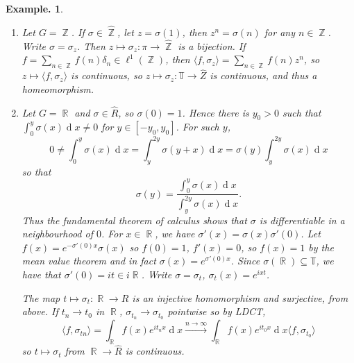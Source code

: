 \documentclass[11pt, a4paper]{memoir}
\DeclareMathOperator{\Z}{{\mathbb{Z}}}
\DeclareMathOperator{\R}{{\mathbb{R}}}
\newcommand{\fto}[1]{\ensuremath{\xrightarrow{\scriptstyle{#1}}}}
\theoremstyle{change}
\theoremstyle{plain}
\theoremstyle{nonumberplain}
\newtheorem{example}{Example.}
\renewcommand{\d}[1]{\ensuremath{\operatorname{d}\!{#1}}}
\numberwithin{equation}{section}
\begin{document}
\begin{example}
    \begin{enumerate}
        \item Let $G=\Z$.
            If $\sigma\in\hat{\Z}$, let $z=\sigma(1)$, then $z^n=\sigma(n)$ for any $n\in\Z$.
            Write $\sigma=\sigma_z$.
            Then $z\mapsto\sigma_z:\pi\to\widehat{\Z}$ is a bijection.
            If $f=\sum_{n\in\Z}f(n)\delta_n\in\ell^1(\Z)$, then $\langle f,\sigma_z\rangle=\sum_{n\in\Z}f(n)z^n$, so $z\mapsto\langle f,\sigma_z\rangle$ is continuous, so $z\mapsto\sigma_z:\mathbb{T}\to\widehat{Z}$ is continuous, and thus a homeomorphism.
        \item Let $G=\R$ and $\sigma\in\widehat{R}$, so $\sigma(0)=1$.
            Hence there is $y_0>0$ such that $\int_0^y\sigma(x)\d{x}\neq 0$ for $y\in[-y_0,y_0]$.
            For such $y$,
            \begin{equation*}
                0\neq\int_0^y\sigma(x)\d{x}=\int_y^{2y}\sigma(y+x)\d{x}=\sigma(y)\int_y^{2y}\sigma(x)\d{x}
            \end{equation*}
            so that
            \begin{equation*}
                \sigma(y) = \frac{\int_0^y\sigma(x)\d{x}}{\int_y^{2y}\sigma(x)\d{x}}.
            \end{equation*}
            Thus the fundamental theorem of calculus shows that $\sigma$ is differentiable in a neighbourhood of $0$.
            For $x\in\R$, we have $\sigma'(x)=\sigma(x)\sigma'(0)$.
            Let $f(x)=e^{-\sigma'(0)x}\sigma(x)$ so $f(0)=1$, $f'(x)=0$, so $f(x)=1$ by the mean value theorem and in fact $\sigma(x)=e^{\sigma'(0)x}$.
            Since $\sigma(\R)\subseteq\mathbb{T}$, we have that $\sigma'(0)=it\in i\R$.
            Write $\sigma=\sigma_t$, $\sigma_t(x)=e^{ixt}$.

            The map $t\mapsto\sigma_t:\R\to\widehat{R}$ is an injective homomorphism and surjective, from above.
            If $t_n\to t_0$ in $\R$, $\sigma_{t_n}\to\sigma_{t_0}$ pointwise so by LDCT,
            \begin{equation*}
                \langle f,\sigma_{tn}\rangle=\int_{\R}f(x)e^{it_nx}\d{x}\fto{n\to\infty}\int_{\R}f(x)e^{it_0 x}\d{x}\langle f,\sigma_{t_0}\rangle
            \end{equation*}
            so $t\mapsto\sigma_t$ from $\R\to\widehat{R}$ is continuous.


\end{enumerate}
\end{example}
\end{document}

